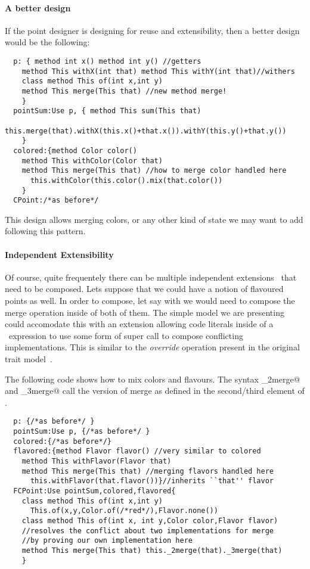 \paragraph{A better design}
If the point designer is designing for reuse and extensibility, then 
a better design would be the following:  
\saveSpace\begin{lstlisting}
  p: { method int x() method int y() //getters
    method This withX(int that) method This withY(int that)//withers
    class method This of(int x,int y)
    method This merge(This that) //new method merge!
    }
  pointSum:Use p, { method This sum(This that)
      this.merge(that).withX(this.x()+that.x()).withY(this.y()+that.y())
    }
  colored:{method Color color()
    method This withColor(Color that)
    method This merge(This that) //how to merge color handled here
      this.withColor(this.color().mix(that.color())
    }
  CPoint:/*as before*/
\end{lstlisting}  \saveSpace
  \noindent This design allows merging colors, or any other kind of state we may want to add
  following this pattern.%

\paragraph{Independent Extensibility}
  Of course, quite frequentely there can be multiple independent
  extensions~\cite{Zenger-Odersky2005} that need to be composed. Lets suppose that 
  we could have a notion of flavoured points as well.   
  In order to compose, let say \Q@colored@ with \Q@flavored@ we would
  need to compose the merge operation inside of both of them.
  The simple model we are presenting could accomodate this with an
  extension allowing code literals inside of a \use\ expression to use some form of super call to compose conflicting implementations. This is similar to the \emph{override} operation present in the original trait model~\cite{ducasse2006traits}.

The following code shows how to mix colors and flavours. The syntax \Q@_2merge@ and   \Q@_3merge@
call the version of merge as defined in the second/third element of \use.
\saveSpace\begin{lstlisting}
  p: {/*as before*/ }
  pointSum:Use p, {/*as before*/ }
  colored:{/*as before*/}
  flavored:{method Flavor flavor() //very similar to colored
    method This withFlavor(Flavor that)
    method This merge(This that) //merging flavors handled here
      this.withFlavor(that.flavor())}//inherits ``that'' flavor
  FCPoint:Use pointSum,colored,flavored{
    class method This of(int x,int y)
      This.of(x,y,Color.of(/*red*/),Flavor.none())
    class method This of(int x, int y,Color color,Flavor flavor)
    //resolves the conflict about two implementations for merge
    //by proving our own implementation here
    method This merge(This that) this._2merge(that)._3merge(that)
    }
\end{lstlisting}  \saveSpace\saveSpace
